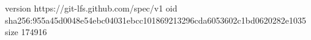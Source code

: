 version https://git-lfs.github.com/spec/v1
oid sha256:955a45d0048e54ebc04031ebcc101869213296cda6053602c1bd0620282e1035
size 174916
